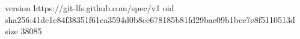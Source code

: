 version https://git-lfs.github.com/spec/v1
oid sha256:41dc1c84f38351f61ea3594d0b8cc678185b81fd29bae09b1bee7e8f5110513d
size 38085

